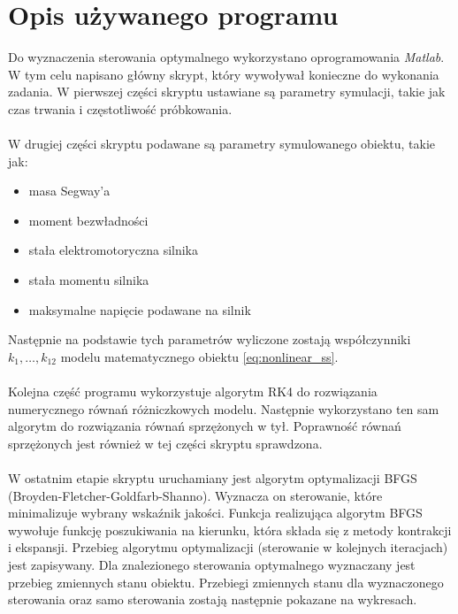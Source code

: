 \section{Opis używanego programu}
\label{sec:opis_uzywanego_programu}

Do wyznaczenia sterowania optymalnego wykorzystano oprogramowania \textit{Matlab}. W tym celu napisano główny skrypt, który wywoływał konieczne do wykonania zadania. W pierwszej części skryptu ustawiane są parametry symulacji, takie jak czas trwania i częstotliwość próbkowania.
\paragraph*{}
W drugiej części skryptu podawane są parametry symulowanego obiektu, takie jak:
\begin{itemize}
\item masa Segway'a
\item moment bezwładności
\item stała elektromotoryczna silnika
\item stała momentu silnika
\item maksymalne napięcie podawane na silnik
\end{itemize}
Następnie na podstawie tych parametrów wyliczone zostają współczynniki \(k_1,\dots,k_{12}\) modelu matematycznego obiektu \eqref{eq:nonlinear_ss}.
\paragraph*{}
Kolejna część programu wykorzystuje algorytm RK4 do rozwiązania numerycznego równań różniczkowych modelu. Następnie wykorzystano ten sam algorytm do rozwiązania równań sprzężonych w tył. Poprawność równań sprzężonych jest również w tej części skryptu sprawdzona.
\paragraph*{}
W ostatnim etapie skryptu uruchamiany jest algorytm optymalizacji BFGS (Broyden-Fletcher-Goldfarb-Shanno). Wyznacza on sterowanie, które minimalizuje wybrany wskaźnik jakości. Funkcja realizująca algorytm BFGS wywołuje funkcję poszukiwania na kierunku, która składa się z metody kontrakcji i ekspansji. Przebieg algorytmu optymalizacji (sterowanie w kolejnych iteracjach) jest zapisywany. Dla znalezionego sterowania optymalnego wyznaczany jest przebieg zmiennych stanu obiektu. Przebiegi zmiennych stanu dla wyznaczonego sterowania oraz samo sterowania zostają następnie pokazane na wykresach.